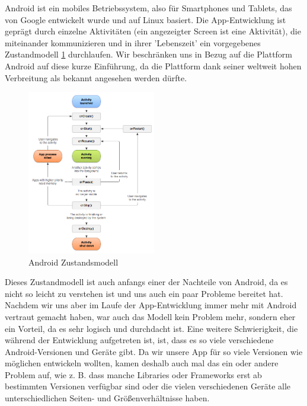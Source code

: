 Android ist ein mobiles Betriebssystem, also für Smartphones und Tablets, das von Google entwickelt wurde und auf Linux basiert. Die App-Entwicklung ist geprägt durch einzelne Aktivitäten (ein angezeigter Screen ist eine Aktivität), die miteinander kommunizieren und in ihrer 'Lebenszeit' ein vorgegebenes Zustandmodell \ref{figure:androidZustandsmodell} durchlaufen. Wir beschränken uns in Bezug auf die Plattform Android auf diese kurze Einführung, da die Plattform dank seiner weltweit hohen Verbreitung als bekannt angesehen werden dürfte.

\begin{figure}[htp]
	\centering
  	\includegraphics[width=0.5\textwidth]{img/modelle/AndroidZustandsmodell.png}
	\caption[Android Zustandsmodell]{Android Zustandsmodell\footnotemark}
	\label{figure:androidZustandsmodell}
\end{figure}

Dieses Zustandmodell ist auch anfangs einer der Nachteile von Android, da es nicht so leicht zu verstehen ist und uns auch ein paar Probleme bereitet hat. Nachdem wir uns aber im Laufe der App-Entwicklung immer mehr mit Android vertraut gemacht haben, war auch das Modell kein Problem mehr, sondern eher ein Vorteil, da es sehr logisch und durchdacht ist. Eine weitere Schwierigkeit, die während der Entwicklung aufgetreten ist, ist, dass es so viele verschiedene Android-Versionen und Geräte gibt. Da wir unsere App für so viele Versionen wie möglichen entwickeln wollten, kamen deshalb auch mal das ein oder andere Problem auf, wie z. B. dass manche Libraries oder Frameworks erst ab bestimmten Versionen verfügbar sind oder die vielen verschiedenen Geräte alle unterschiedlichen Seiten- und Größenverhältnisse haben.

